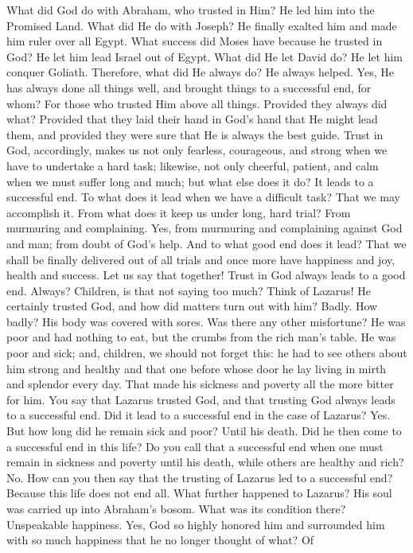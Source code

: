 What did God do with Abraham, who trusted in Him? He led him into the Promised Land. What did He do with Joseph? He finally exalted him and made him ruler over all Egypt. What success did Moses have because he trusted in God? He let him lead Israel out of Egypt. What did He let David do? He let him conquer Goliath. Therefore, what did He always do? He always helped. Yes, He has always done all things well, and brought things to a successful end, for whom? For those who trusted Him above all things. Provided they always did what? Provided that they laid their hand in God’s hand that He might lead them, and provided they were sure that He is always the best guide. Trust in God, accordingly, makes us not only fearless, courageous, and strong when we have to undertake a hard task; likewise, not only cheerful, patient, and calm when we must suffer long and much; but what else does it do? It leads to a successful end. To what does it lead when we have a difficult task? That we may accomplish it. From what does it keep us under long, hard trial? From murmuring and complaining. Yes, from murmuring and complaining against God and man; from doubt of God’s help. And to what good end does it lead? That we shall be finally delivered out of all trials and once more have happiness and joy, health and success. Let us say that together! Trust in God always leads to a good end. Always? Children, is that not saying too much? Think of Lazarus! He certainly trusted God, and how did matters turn out with him? Badly. How badly? His body was covered with sores. Was there any other misfortune? He was poor and had nothing to eat, but the crumbs from the rich man’s table. He was poor and sick; and, children, we should not forget this: he had to see others about him strong and healthy and that one before whose door he lay living in mirth and splendor every day. That made his sickness and poverty all the more bitter for him. You say that Lazarus trusted God, and that trusting God always leads to a successful end. Did it lead to a successful end in the case of Lazarus? Yes. But how long did he remain sick and poor? Until his death. Did he then come to a successful end in this life? Do you call that a successful end when one must remain in sickness and poverty until his death, while others are healthy and rich? No. How can you then say that the trusting of Lazarus led to a successful end? Because this life does not end all. What further happened to Lazarus? His soul was carried up into Abraham’s bosom. What was its condition there? Unspeakable happiness. Yes, God so highly honored him and surrounded him with so much happiness that he no longer thought of what? Of
